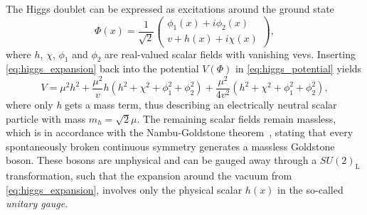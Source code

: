 The Higgs doublet can be expressed as excitations around the ground state
\begin{equation}
	\Phi(x) = \frac{1}{\sqrt{2}} \begin{pmatrix}
		\phi_1(x)+i\phi_2(x) \\
		v + h(x) + i\chi(x)
	\end{pmatrix},
	\label{eq:higgs_expansion}
\end{equation}
where $h$, $\chi$, $\phi_1$ and $\phi_2$ are real-valued scalar fields with vanishing \glspl{vev}. Inserting 
\cref{eq:higgs_expansion} back into the potential $V(\Phi)$ in \cref{eq:higgs_potential} yields
\begin{equation}
	V = \mu^2h^2 + \frac{\mu^2}{v} h (h^2 + \chi^2 + \phi_1^2+\phi_2^2)+ \frac{\mu^2}{4v^2}(h^2 + \chi^2 + \phi_1^2 + \phi_2^2),
	\label{eq:higgs_potential_excitation}
\end{equation}
where only \textit{h} gets a mass term, thus describing an electrically neutral scalar particle with mass $m_h = \sqrt{2}\mu$.
The remaining scalar fields remain massless, which is in accordance with the Nambu-Goldstone theorem~\cite{Nambu:1960tm,Goldstone:1961eq}, stating that every spontaneously broken continuous symmetry generates a massless Goldstone boson. These bosons are unphysical and can be gauged away through a $SU(2)_\mathrm{L}$ transformation, such that the expansion around the vacuum from \cref{eq:higgs_expansion}, involves only the physical scalar $h(x)$ in the so-called \textit{unitary gauge}.
